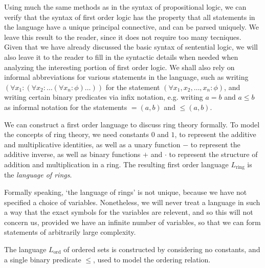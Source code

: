 Using much the same methods as in the syntax of propositional logic, we can verify that the syntax of first order logic has the property that all statements in the language have a unique principal connective, and can be parsed uniquely. We leave this result to the reader, since it does not require too many tecniques. Given that we have already discussed the basic syntax of sentential logic, we will also leave it to the reader to fill in the syntactic details when needed when analyzing the interesting portion of first order logic. We shall also rely on informal abbreviations for various statements in the language, such as writing $(\forall x_1 : (\forall x_2: \dots (\forall x_n: \phi)\dots))$ for the statement $(\forall x_1, x_2, \dots, x_n : \phi)$, and writing certain binary predicates via infix notation, e.g. writing $a = b$ and $a \leq b$ as informal notation for the statements $=(a,b)$ and $\leq(a,b)$.

\begin{example}
    We can construct a first order language to discuss ring theory formally. To model the concepts of ring theory, we need constants $0$ and $1$, to represent the additive and multiplicative identities, as well as a unary function $-$ to represent the additive inverse, as well as binary functions $+$ and $\cdot$ to represent the structure of addition and multiplication in a ring. The resulting first order language $L_{\text{ring}}$ is the \emph{language of rings}.
\end{example}

Formally speaking, `the language of rings' is not unique, because we have not specified a choice of variables. Nonetheless, we will never treat a language in such a way that the exact symbols for the variables are relevent, and so this will not concern us, provided we have an infinite number of variables, so that we can form statements of arbitrarily large complexity.

\begin{example}
    The language $L_{\text{ord}}$ of ordered sets is constructed by considering no constants, and a single binary predicate $\leq$, used to model the ordering relation.
\end{example}

